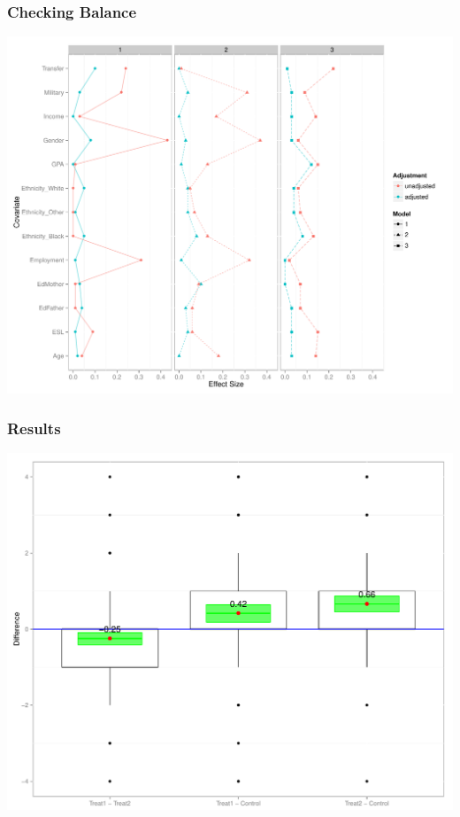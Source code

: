 \documentclass[10pt,slidestop,mathserif,c]{beamer}
\begin{document}
\begin{frame}
    \frametitle{Checking Balance}
\begin{center}
    \includegraphics{figures/Slides-balanceplot}
\end{center}
\end{frame}

\begin{frame}
    \frametitle{Results}
\begin{center}
    \includegraphics{figures/Slides-boxdiff}
\end{center}
\end{frame}
\end{document}
